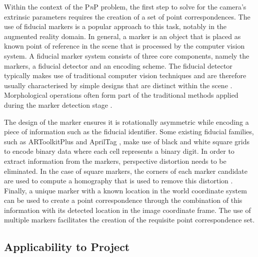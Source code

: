 Within the context of the P\textit{n}P problem, the first step to solve for the camera's extrinsic parameters requires the creation of a set of point correspondences. The use of fiducial markers is a popular approach to this task, notably in the augmented reality domain. In general, a marker is an object that is placed as known point of reference in the scene that is processed by the computer vision system. A fiducial marker system consists of three core components, namely the markers, a fiducial detector and an encoding scheme. The fiducial detector typically makes use of traditional computer vision techniques and are therefore usually characterised by simple designs that are distinct within the scene \cite{Zhang:DeepTag_General_Framework_for_Fiducial_Marker_Design}. Morphological operations often form part of the traditional methods applied during the marker detection stage  \cite{Kostak:Designing_a_Simple_Fiducial_Marker}. 

The design of the marker ensures it is rotationally asymmetric while encoding a piece of information such as the fiducial identifier. Some existing fiducial families, such as ARToolkitPlus \cite{Wagner:ARToolKitPlus} and AprilTag \cite{Olson:AprilTag}, make use of black and white square grids to encode binary data where each cell represents a binary digit. In order to extract information from the markers, perspective distortion needs to be eliminated. In the case of square markers, the corners of each marker candidate are used to compute a homography that is used to remove this distortion \cite{Hirzer:Marker_Detection_for_Augmented_Reality_Applications}. Finally, a unique marker with a known location in the world coordinate system can be used to create a point correspondence through the combination of this information with its detected location in the image coordinate frame. The use of multiple markers facilitates the creation of the requisite point correspondence set.


\subsection{Applicability to Project}



